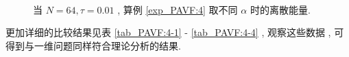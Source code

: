 \begin{figure}[H]
	\begin{center}
	\\
	\caption{当  $N = 64 , \tau=0.01$ , 算例 \ref{exp_PAVF:4} 取不同 $\alpha$ 时的离散能量.}
	\label{fig_PAVF:10}
	\end{center}
	\end{figure}
	更加详细的比较结果见表 \ref{tab_PAVF:4-1} - \ref{tab_PAVF:4-4} , 观察这些数据 , 可得到与一维问题同样符合理论分析的结果.


